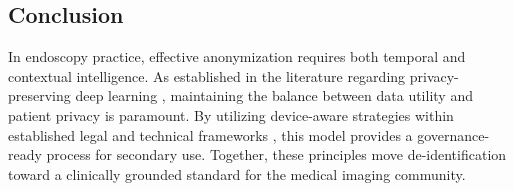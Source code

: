 \documentclass{article}
\begin{document}
\subsection{Conclusion}
In endoscopy practice, effective anonymization requires both temporal and
contextual intelligence. As established in the literature regarding privacy-preserving 
deep learning \cite{armas2020privacy}, maintaining the balance between data 
utility and patient privacy is paramount. By utilizing device-aware strategies 
within established legal and technical frameworks \cite{wanyan2022data}, 
this model provides a governance-ready process for secondary use. 
Together, these principles move de-identification toward a clinically 
grounded standard for the medical imaging community.
\newpage
 
 
 
\end{document}
